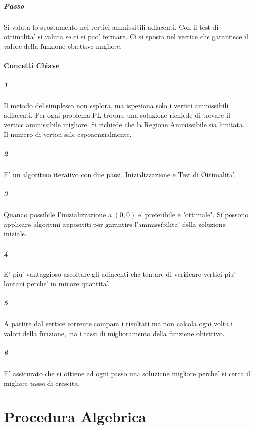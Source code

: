 \subparagraph{Passo}
Si valuta lo spostamento nei vertici ammissibili adiacenti.
Con il test di ottimalita' si valuta se ci si puo' fermare.
Ci si sposta nel vertice che garantisce il valore della funzione obiettivo migliore.

\paragraph{Concetti Chiave}

\subparagraph{1}
Il metodo del simplesso non esplora, ma ispeziona solo i vertici ammissibili adiacenti.
Per ogni problema PL trovare una soluzione richiede di trovare il vertice ammissibile migliore.
Si richiede che la Regione Ammissibile sia limitata.
Il numero di vertici sale esponenzialmente.

\subparagraph{2}
E' un algoritmo iterativo con due passi, Inizializzazione e Test di Ottimalita'.

\subparagraph{3}
Quando possibile l'inizializzazione a $(0,0)$ e' preferibile e "ottimale".
Si possono applicare algoritmi apposititi per garantire l'ammissibilita' della soluzione iniziale.

\subparagraph{4}
E' piu' vantaggioso ascoltare gli adiacenti che tentare di verificare vertici piu' lontani perche' in minore quantita'.

\subparagraph{5}
A partire dal vertice corrente compara i risultati ma non calcola ogni volta i valori della funzione, ma i tassi di miglioramento della funzione obiettivo.

\subparagraph{6}
E' assicurato che si ottiene ad ogni passo una soluzione migliore perche' si cerca il migliore tasso di crescita.

\section{Procedura Algebrica}
